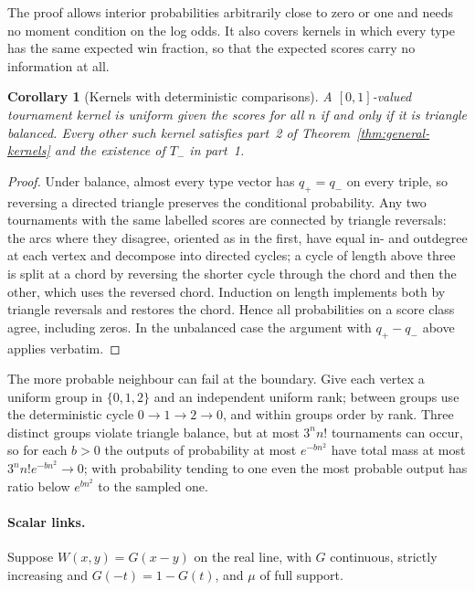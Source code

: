 \documentclass[11pt,a4paper]{article}
\newtheorem{corollary}[theorem]{Corollary}
\theoremstyle{definition}
\begin{document}
The proof allows interior probabilities arbitrarily close to zero or one and needs no moment condition on the log odds. It also covers kernels in which every type has the same expected win fraction, so that the expected scores carry no information at all.

\begin{corollary}[Kernels with deterministic comparisons]\label{cor:boundary}
A $[0,1]$-valued tournament kernel is uniform given the scores for all $n$ if and only if it is triangle balanced. Every other such kernel satisfies part~2 of Theorem~\ref{thm:general-kernels} and the existence of $T_-$ in part~1.
\end{corollary}
\begin{proof}
Under balance, almost every type vector has $q_+=q_-$ on every triple, so reversing a directed triangle preserves the conditional probability. Any two tournaments with the same labelled scores are connected by triangle reversals: the arcs where they disagree, oriented as in the first, have equal in- and outdegree at each vertex and decompose into directed cycles; a cycle of length above three is split at a chord by reversing the shorter cycle through the chord and then the other, which uses the reversed chord. Induction on length implements both by triangle reversals and restores the chord. Hence all probabilities on a score class agree, including zeros. In the unbalanced case the argument with $q_+-q_-$ above applies verbatim.
\end{proof}

The more probable neighbour can fail at the boundary. Give each vertex a uniform group in $\{0,1,2\}$ and an independent uniform rank; between groups use the deterministic cycle $0\to1\to2\to0$, and within groups order by rank. Three distinct groups violate triangle balance, but at most $3^n n!$ tournaments can occur, so for each $b>0$ the outputs of probability at most $e^{-bn^2}$ have total mass at most $3^n n!e^{-bn^2}\to0$; with probability tending to one even the most probable output has ratio below $e^{bn^2}$ to the sampled one.

\paragraph{Scalar links.} Suppose $W(x,y)=G(x-y)$ on the real line, with $G$ continuous, strictly increasing and $G(-t)=1-G(t)$, and $\mu$ of full support.
\end{document}
